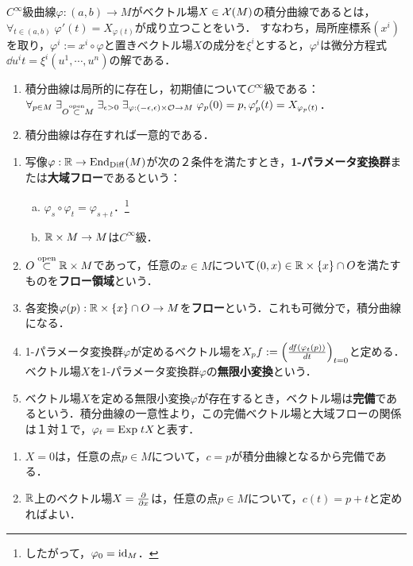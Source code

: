 \documentclass[uplatex,dvipdfmx]{jsreport}
\begin{document}
\begin{definition}
    $C^\infty$級曲線$\varphi:(a,b)\to M$がベクトル場$X\in\mathcal{X}(M)$の積分曲線であるとは，$\forall_{t\in(a,b)}\;\varphi'(t)=X_{\varphi(t)}$が成り立つことをいう．
    すなわち，局所座標系$(x^i)$を取り，$\varphi^i:=x^i\circ\varphi$と置きベクトル場$X$の成分を$\xi^i$とすると，$\varphi^i$は微分方程式$\dd{u^i}{t}=\xi^i(u^1,\cdots,u^n)$の解である．
\end{definition}
\begin{lemma}[局所的存在と一意性]\mbox{}
    \begin{enumerate}
        \item 積分曲線は局所的に存在し，初期値について$C^\infty$級である：$\forall_{p\in M}\;\exists_{O\overset{\mathrm{open}}{\subset} M}\;\exists_{\epsilon>0}\;\exists_{\varphi:(-\epsilon,\epsilon)\times\mathcal{O}\to M}\;\varphi_p(0)=p,\varphi'_p(t)=X_{\varphi_p(t)}$．
        \item 積分曲線は存在すれば一意的である．
    \end{enumerate}
\end{lemma}

\begin{definition}\mbox{}
    \begin{enumerate}
        \item 写像$\varphi:\mathbb{R}\to\mathrm{End}_{\mathrm{Diff}}(M)$が次の２条件を満たすとき，\textbf{1-パラメータ変換群}または\textbf{大域フロー}であるという：
        \begin{enumerate}[(a)]
            \item $\varphi_s\circ\varphi_t=\varphi_{s+t}$．\footnote{したがって，$\varphi_0=\mathrm{id}_M$．}
            \item $\mathbb{R}\times M\to M$は$C^\infty$級．
        \end{enumerate}
        \item $O\overset{\mathrm{open}}{\subset} \mathbb{R}\times M$であって，任意の$x\in M$について$(0,x)\in\mathbb{R}\times\{x\}\cap O$を満たすものを\textbf{フロー領域}という．
        \item 各変換$\varphi(p):\mathbb{R}\times\{x\}\cap O\to M$を\textbf{フロー}という．これも可微分で，積分曲線になる．
        \item 1-パラメータ変換群$\varphi$が定めるベクトル場を$X_pf:=\left(\frac{d f(\varphi_t(p))}{d t}\right)_{t=0}$と定める．ベクトル場$X$を1-パラメータ変換群$\varphi$の\textbf{無限小変換}という．
        \item ベクトル場$X$を定める無限小変換$\varphi$が存在するとき，ベクトル場は\textbf{完備}であるという．積分曲線の一意性より，この完備ベクトル場と大域フローの関係は１対１で，$\varphi_t=\mathrm{Exp}\; tX$と表す．
    \end{enumerate}
\end{definition}
\begin{example}\mbox{}
    \begin{enumerate}
        \item $X=0$は，任意の点$p\in M$について，$c=p$が積分曲線となるから完備である．
        \item $\mathbb{R}$上のベクトル場$X=\frac{\partial }{\partial x}$は，任意の点$p\in M$について，$c(t)=p+t$と定めればよい．
    \end{enumerate}
\end{example}
\end{document}
